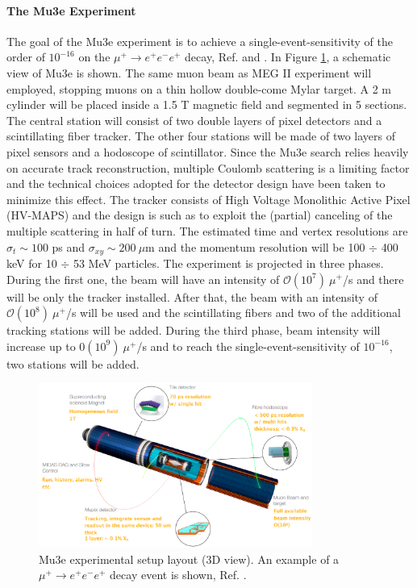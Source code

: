 \paragraph{The Mu3e Experiment}
The goal of the Mu3e experiment is to achieve a single-event-sensitivity of the order
of $10^{-16}$ on the $\mu^+ \rightarrow e^+ e^-  e^+ $ decay, Ref. \cite{hesketh2022mu3e} and \cite{papa}. 
In Figure \ref{fig:mu3e}, a schematic view of Mu3e is shown.
The same muon beam as MEG II experiment will employed, stopping muons on a thin hollow double-come Mylar target. 
A 2 m cylinder will be placed inside a 1.5 T magnetic field and segmented in 5 sections. 
The central station will consist of two double layers of pixel detectors and a
scintillating fiber tracker. The other four stations will be made of two layers of pixel
sensors and a hodoscope of scintillator. Since the Mu3e search relies heavily on accurate track reconstruction, multiple Coulomb
scattering is a limiting factor and the technical choices adopted for the detector design
have been taken to minimize this effect. The tracker consists of High Voltage Monolithic
Active Pixel (HV-MAPS) and the design is such as to exploit the (partial) canceling of
the multiple scattering in half of turn. The estimated time and vertex resolutions are
$\sigma_t \sim 100$ ps and $\sigma_{xy} \sim 200 \ \mu$m and the momentum resolution will be 100 $\div$ 400 keV for 10 $\div$ 53
MeV particles. The experiment is projected in three phases. During the first one, the beam will have an intensity of $\mathcal{O}(10^7) \ \mu^+$/s 
and there will be only the tracker installed. After that, the beam with an intensity of $\mathcal{O}(10^8) \ \mu^+$/s will 
be used and the scintillating fibers and two of the additional tracking stations will be added.
During the third phase, beam intensity will increase up to $\mathcal{0}(10^9) \ \mu^+$/s and to 
reach the single-event-sensitivity of $10^{-16}$, two stations will be added.
\begin{figure}[!h]
\centering
\includegraphics[width =0.8\textwidth]{figures/png/Screenshot_20240321_143650}
\caption{Mu3e experimental setup layout (3D view). An example of a $\mu^+ \rightarrow e^+ e^-  e^+ $ decay event is shown, Ref. \cite{papa}.}
\label{fig:mu3e}
\end{figure}









